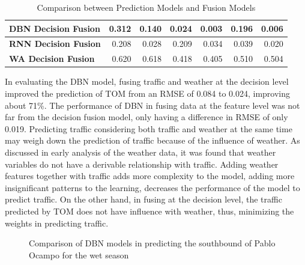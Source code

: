 \begin{table}[h]
\begin{tabular}{|l|r|r|r|r|r|r|}
\textbf{DBN Decision Fusion}                & 0.312                              & 0.140                             & 0.024                              & 0.003                             & 0.196                              & 0.006                             \\ \hline
\textbf{RNN Decision Fusion}                & 0.208                              & 0.028                             & 0.209                              & 0.034                             & 0.039                              & 0.020                             \\ \hline
\textbf{WA Decision Fusion}                 & 0.620                              & 0.618                             & 0.418                              & 0.405                             & 0.510                              & 0.504                             \\ \hline
\end{tabular}
\caption{Comparison between Prediction Models and Fusion Models}
\label{table:fusion_results}
\end{table}

In evaluating the DBN model, fusing traffic and weather at the decision level improved the prediction of TOM from an RMSE of 0.084 to 0.024, improving about 71\%. The performance of DBN in fusing data at the feature level was not far from the decision fusion model, only having a difference in RMSE of only 0.019. Predicting traffic considering both traffic and weather at the same time may weigh down the prediction of traffic because of the influence of weather. As discussed in early analysis of the weather data, it was found that weather variables do not have a derivable relationship with traffic. Adding weather features together with traffic adds more complexity to the model, adding more insignificant patterns to the learning, decreases the performance of the model to predict traffic. On the other hand, in fusing at the decision level, the traffic predicted by TOM does not have influence with weather, thus, minimizing the weights in predicting traffic. 


\begin{figure}[h]
  \centering
  \captionsetup{justification=centering}
  \caption{Comparison of DBN models in predicting the southbound of Pablo Ocampo for the wet season}
  \label{fig:dbn_comp_pocampo}
\end{figure}


